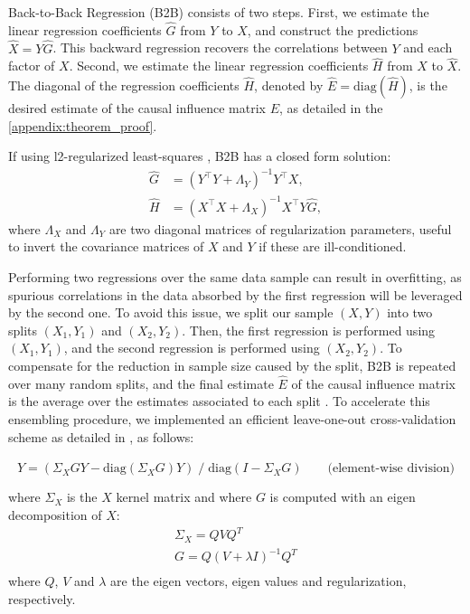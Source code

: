 \documentclass{article}
\begin{document}
Back-to-Back Regression (B2B) consists of two steps.
%
First, we estimate the linear regression coefficients $\hat G$ from $Y$ to $X$, and construct the predictions $\hat X = Y \hat G$.
%
This backward regression recovers the correlations between $Y$ and each factor of $X$.
%
Second, we estimate the linear regression coefficients $\hat H$ from $X$ to $\hat X$.
%
The diagonal of the regression coefficients $\hat H$, denoted by $\hat{E} = \text{diag}(\hat{H})$, is the desired estimate of the causal influence matrix $E$, as detailed in the \ref{appendix:theorem_proof}.

If using l2-regularized least-squares \citep{hoerl1959optimum, rifkin2007notes}, B2B has a closed form solution:
\begin{align}
    \hat G &= (Y^\top Y + \Lambda_Y)^{-1} Y^\top X,\label{eq:solG}\\
    \hat H &=(X^\top X + \Lambda_X)^{-1} X^\top Y \hat G,\label{eq:solH}
\end{align}
%
where $\Lambda_X$ and $\Lambda_Y$ are two diagonal matrices of regularization parameters, useful to invert the covariance matrices of $X$ and $Y$ if these are ill-conditioned.

Performing two regressions over the same data sample can result in overfitting, as spurious correlations in the data absorbed by the first regression will be leveraged by the second one.
%
To avoid this issue, we split our sample $(X, Y)$ into two splits $(X_1, Y_1)$ and $(X_2, Y_2)$.
%
Then, the first regression is performed using $(X_1, Y_1)$, and the second regression is performed using $(X_2, Y_2)$.
%
To compensate for the reduction in sample size caused by the split, B2B is repeated over many random splits, and the final estimate $\hat E$ of the causal influence matrix is the average over the estimates associated to each split \citep{breiman1996bagging}.
%
To accelerate this ensembling procedure, we implemented an efficient leave-one-out cross-validation scheme as detailed in \citep{rifkin2007notes} %
, as follows:
%

\begin{equation}
\hat{Y} = (\Sigma_X G Y - \text{diag}(\Sigma_X G) Y) \;/\; \text{diag}(I - \Sigma_X G) \qquad \text{(element-wise division)}
\end{equation}

where $\Sigma_X$ is the $X$ kernel matrix and where $G$ is computed with an eigen decomposition of $X$:
\begin{equation}
  \begin{aligned}
  \Sigma_X = Q V Q^T \\
  G = Q (V + \lambda I)^{-1} Q^T\\
  \end{aligned}
\end{equation}
where $Q$, $V$ and $\lambda$ are the eigen vectors, eigen values and regularization, respectively.
\end{document}
